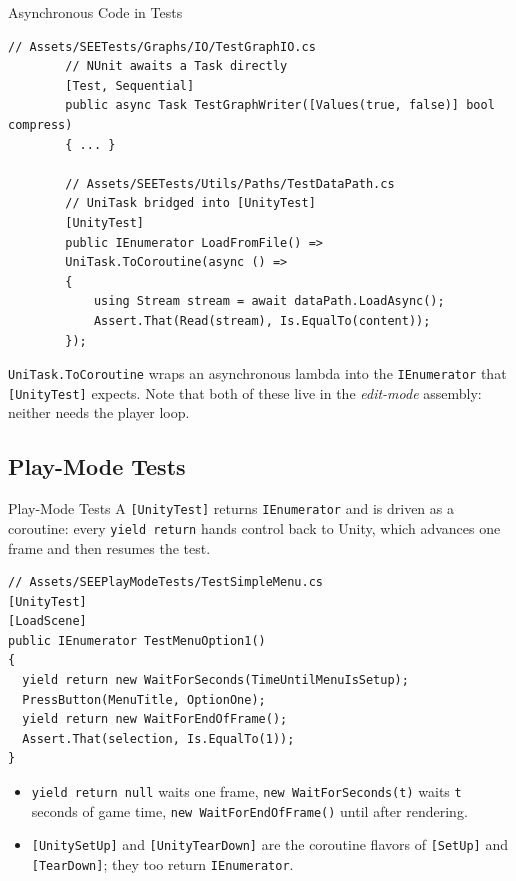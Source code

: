 \begin{frame}[fragile]{Asynchronous Code in Tests}
    \begin{lstlisting}[basicstyle=\scriptsize\ttfamily]
        // Assets/SEETests/Graphs/IO/TestGraphIO.cs
        // NUnit awaits a Task directly
        [Test, Sequential]
        public async Task TestGraphWriter([Values(true, false)] bool compress)
        { ... }

        // Assets/SEETests/Utils/Paths/TestDataPath.cs
        // UniTask bridged into [UnityTest]
        [UnityTest]
        public IEnumerator LoadFromFile() =>
        UniTask.ToCoroutine(async () =>
        {
            using Stream stream = await dataPath.LoadAsync();
            Assert.That(Read(stream), Is.EqualTo(content));
        });
    \end{lstlisting}
    \vspace{1ex}

    \texttt{UniTask.ToCoroutine} wraps an asynchronous lambda into the
    \texttt{IEnumerator} that \texttt{[UnityTest]} expects. Note that both of
    these live in the \emph{edit-mode} assembly: neither needs the player loop.
\end{frame}

\subsection{Play-Mode Tests}

\begin{frame}[fragile]{Play-Mode Tests}
  A \texttt{[UnityTest]} returns \texttt{IEnumerator} and is driven as a
  coroutine: every \texttt{yield return} hands control back to Unity, which
  advances one frame and then resumes the test.
  \vspace{1ex}

  \begin{lstlisting}[basicstyle=\scriptsize\ttfamily]
// Assets/SEEPlayModeTests/TestSimpleMenu.cs
[UnityTest]
[LoadScene]
public IEnumerator TestMenuOption1()
{
  yield return new WaitForSeconds(TimeUntilMenuIsSetup);
  PressButton(MenuTitle, OptionOne);
  yield return new WaitForEndOfFrame();
  Assert.That(selection, Is.EqualTo(1));
}
  \end{lstlisting}
  \vspace{1ex}

  \begin{itemize}
    \item \texttt{yield return null} waits one frame,
      \texttt{new WaitForSeconds(t)} waits \texttt{t} seconds of game time,
      \texttt{new WaitForEndOfFrame()} until after rendering.
    \item \texttt{[UnitySetUp]} and \texttt{[UnityTearDown]} are the coroutine
      flavors of \texttt{[SetUp]} and \texttt{[TearDown]}; they too return
      \texttt{IEnumerator}.
  \end{itemize}
\end{frame}

